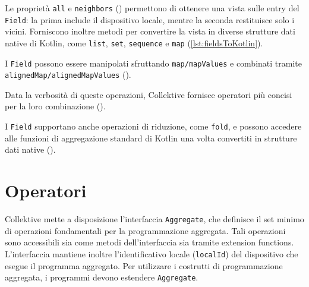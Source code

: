 

Le proprietà \texttt{all} e \texttt{neighbors} () permettono di ottenere una vista sulle entry del \texttt{Field}: la prima include il dispositivo locale, mentre la seconda restituisce solo i vicini.
Forniscono inoltre metodi per convertire la vista in diverse strutture dati native di Kotlin, come \texttt{list}, \texttt{set}, \texttt{sequence} e \texttt{map} (\ref{lst:fieldsToKotlin}).


I \texttt{Field} possono essere manipolati sfruttando \texttt{map/mapValues} e combinati tramite \texttt{alignedMap/alignedMapValues} ().

\newpage


Data la verbosità di queste operazioni, Collektive fornisce operatori più concisi per la loro combinazione ().


I \texttt{Field} supportano anche operazioni di riduzione, come \texttt{fold}, e possono accedere alle funzioni di aggregazione standard di Kotlin una volta convertiti in strutture dati native ().


\section{Operatori}
\label{sec:collektiveaggregateops}
Collektive mette a disposizione l'interfaccia \texttt{Aggregate}, che definisce il set minimo di operazioni fondamentali per la programmazione aggregata. Tali operazioni sono accessibili sia come metodi dell'interfaccia sia tramite extension functions. L'interfaccia mantiene inoltre l'identificativo locale (\texttt{localId}) del dispositivo che esegue il programma aggregato.
%
Per utilizzare i costrutti di programmazione aggregata, i programmi devono estendere \texttt{Aggregate}.

